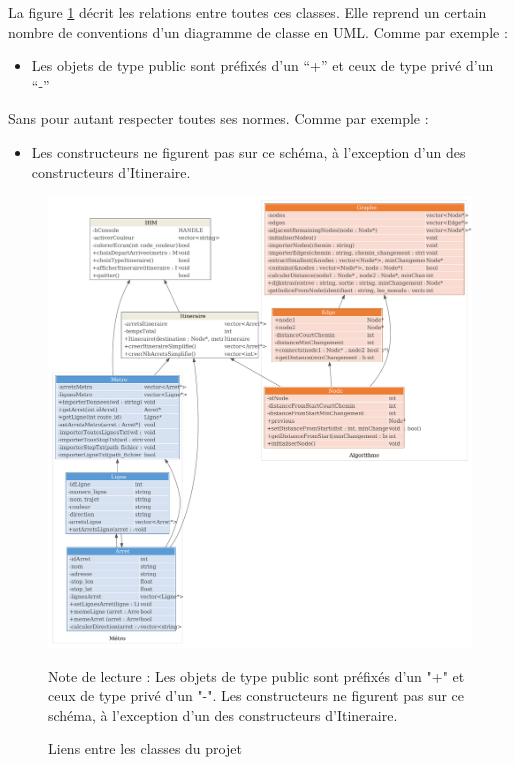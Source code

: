 \documentclass[,french]{article}
\providecommand{\tightlist}{%
  \setlength{\itemsep}{0pt}\setlength{\parskip}{0pt}}
\begin{document}
La figure \ref{fig:diag_classes} décrit les relations entre toutes ces
classes. Elle reprend un certain nombre de conventions d'un diagramme de
classe en UML. Comme par exemple :

\begin{itemize}
\tightlist
\item
  Les objets de type public sont préfixés d'un ``+'' et ceux de type
  privé d'un ``-''
\end{itemize}

Sans pour autant respecter toutes ses normes. Comme par exemple :

\begin{itemize}
\tightlist
\item
  Les constructeurs ne figurent pas sur ce schéma, à l'exception d'un
  des constructeurs d'Itineraire.
\end{itemize}

\begin{figure}[h]
\includegraphics{img/Diagramme_classes/diagramme_classes.pdf} 
\captionsetup{margin=0cm,format=hang,justification=justified}
\caption{Liens entre les classes du projet}\label{fig:diag_classes}

 \footnotesize
Note de lecture : Les objets de type public sont préfixés d'un "+" et ceux de type privé d'un "-". 
Les constructeurs ne figurent pas sur ce schéma, à l'exception d'un des constructeurs d'Itineraire. 
\end{figure}
\end{document}
